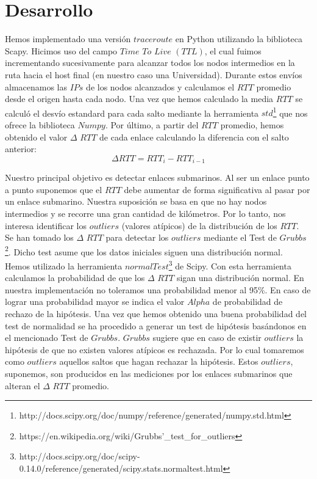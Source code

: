 \section{Desarrollo}

Hemos implementado una versión $traceroute$ en Python utilizando la biblioteca Scapy. 
Hicimos uso del campo $Time$ $To$ $Live$ $(TTL)$, el cual fuimos incrementando sucesivamente para alcanzar todos los nodos intermedios en la ruta 
hacia el host final (en nuestro caso una Universidad). 
Durante estos envíos almacenamos las $IPs$ de los nodos alcanzados y calculamos el $RTT$ promedio desde el origen hasta cada nodo. 
Una vez que hemos calculado la media $RTT$ se calculó el desvío estandard para cada salto mediante la herramienta $std$\footnote{http://docs.scipy.org/doc/numpy/reference/generated/numpy.std.html} 
que nos ofrece la biblioteca $Numpy$.
Por último, a partir del $RTT$ promedio, hemos obtenido el valor $\Delta$ $RTT$ de cada enlace calculando la diferencia con el salto anterior:
\begin{equation}
 \Delta RTT = RTT_{i} - RTT_{i-1}
\end{equation}

Nuestro principal objetivo es detectar enlaces submarinos. Al ser un enlace punto a punto suponemos que el $RTT$ debe aumentar de forma significativa 
al pasar por un enlace submarino. Nuestra suposición se basa en que no hay nodos intermedios y se recorre una gran cantidad de kilómetros. Por lo tanto, nos interesa 
identificar los $outliers$ (valores atípicos) de la distribución de los $RTT$.\\

Se han tomado los $\Delta$ $RTT$ para detectar los $outliers$ mediante el Test de $Grubbs$\footnote{https://en.wikipedia.org/wiki/Grubbs'\_test\_for\_outliers}. 
Dicho test asume que los datos iniciales siguen una distribución normal.\\

Hemos utilizado la herramienta $normalTest$\footnote{http://docs.scipy.org/doc/scipy-0.14.0/reference/generated/scipy.stats.normaltest.html} de Scipy. 
Con esta herramienta calculamos la probabilidad de que los $\Delta$ $RTT$ sigan una distribución normal. En nuestra implementación
no toleramos una probabilidad menor al 95\%. En caso de lograr una probabilidad mayor se indica el valor $Alpha$ de probabilidad de rechazo de la 
hipótesis.
Una vez que hemos obtenido una buena probabilidad del test de normalidad se ha procedido a generar un test de hipótesis basándonos en el mencionado Test de $Grubbs$. 
$Grubbs$ sugiere que en caso de existir $outliers$ la hipótesis de que no existen valores atípicos es rechazada. 
Por lo cual tomaremos como $outliers$ aquellos saltos que hagan rechazar la hipótesis. Estos $outliers$, suponemos, son producidos en las mediciones 
por los enlaces submarinos que alteran el $\Delta$ $RTT$ promedio.\\

